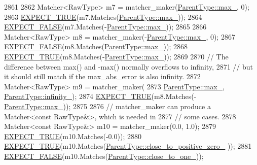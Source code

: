 \begin{DoxyCode}
2861 
2862     Matcher<RawType> m7 = matcher\_maker(\hyperlink{classtesting_1_1gmock__matchers__test_1_1FloatingPointTest_a17b9dd56136b64fa7210bfe024d88c30}{ParentType::max\_}, 0);
2863     \hyperlink{gtest_8h_ac33e7cdfb5d44a7a0f0ab552eb5c3c6a}{EXPECT\_TRUE}(m7.Matches(\hyperlink{classtesting_1_1gmock__matchers__test_1_1FloatingPointTest_a17b9dd56136b64fa7210bfe024d88c30}{ParentType::max\_}));
2864     \hyperlink{gtest_8h_aeb6c7ae89f440c90c1a1815951c836da}{EXPECT\_FALSE}(m7.Matches(-\hyperlink{classtesting_1_1gmock__matchers__test_1_1FloatingPointTest_a17b9dd56136b64fa7210bfe024d88c30}{ParentType::max\_}));
2865 
2866     Matcher<RawType> m8 = matcher\_maker(-\hyperlink{classtesting_1_1gmock__matchers__test_1_1FloatingPointTest_a17b9dd56136b64fa7210bfe024d88c30}{ParentType::max\_}, 0);
2867     \hyperlink{gtest_8h_aeb6c7ae89f440c90c1a1815951c836da}{EXPECT\_FALSE}(m8.Matches(\hyperlink{classtesting_1_1gmock__matchers__test_1_1FloatingPointTest_a17b9dd56136b64fa7210bfe024d88c30}{ParentType::max\_}));
2868     \hyperlink{gtest_8h_ac33e7cdfb5d44a7a0f0ab552eb5c3c6a}{EXPECT\_TRUE}(m8.Matches(-\hyperlink{classtesting_1_1gmock__matchers__test_1_1FloatingPointTest_a17b9dd56136b64fa7210bfe024d88c30}{ParentType::max\_}));
2869 
2870     \textcolor{comment}{// The difference between max() and -max() normally overflows to infinity,}
2871     \textcolor{comment}{// but it should still match if the max\_abs\_error is also infinity.}
2872     Matcher<RawType> m9 = matcher\_maker(
2873         \hyperlink{classtesting_1_1gmock__matchers__test_1_1FloatingPointTest_a17b9dd56136b64fa7210bfe024d88c30}{ParentType::max\_}, \hyperlink{classtesting_1_1gmock__matchers__test_1_1FloatingPointTest_a21d8a019a6365ddff80e301a6163f43f}{ParentType::infinity\_});
2874     \hyperlink{gtest_8h_ac33e7cdfb5d44a7a0f0ab552eb5c3c6a}{EXPECT\_TRUE}(m8.Matches(-\hyperlink{classtesting_1_1gmock__matchers__test_1_1FloatingPointTest_a17b9dd56136b64fa7210bfe024d88c30}{ParentType::max\_}));
2875 
2876     \textcolor{comment}{// matcher\_maker can produce a Matcher<const RawType&>, which is needed in}
2877     \textcolor{comment}{// some cases.}
2878     Matcher<const RawType&> m10 = matcher\_maker(0.0, 1.0);
2879     \hyperlink{gtest_8h_ac33e7cdfb5d44a7a0f0ab552eb5c3c6a}{EXPECT\_TRUE}(m10.Matches(-0.0));
2880     \hyperlink{gtest_8h_ac33e7cdfb5d44a7a0f0ab552eb5c3c6a}{EXPECT\_TRUE}(m10.Matches(\hyperlink{classtesting_1_1gmock__matchers__test_1_1FloatingPointTest_a750555206ab9d5959d6dc84f8a760c57}{ParentType::close\_to\_positive\_zero\_}
      ));
2881     \hyperlink{gtest_8h_aeb6c7ae89f440c90c1a1815951c836da}{EXPECT\_FALSE}(m10.Matches(\hyperlink{classtesting_1_1gmock__matchers__test_1_1FloatingPointTest_a34c97dc5dc07ea62764de87fdd8b7764}{ParentType::close\_to\_one\_}));

\end{DoxyCode}
